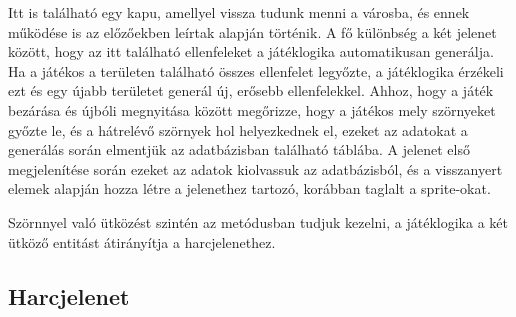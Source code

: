 Itt is található egy kapu, amellyel vissza tudunk menni a városba, és ennek működése is az előzőekben leírtak alapján történik. 
A fő különbség a két jelenet között, hogy az itt található ellenfeleket a játéklogika automatikusan generálja. 
Ha a játékos a területen található összes ellenfelet legyőzte, a játéklogika érzékeli ezt és egy újabb területet generál új, erősebb ellenfelekkel. 
Ahhoz, hogy a játék bezárása és újbóli megnyitása között megőrizze, hogy a játékos mely szörnyeket győzte le, és a hátrelévő szörnyek hol helyezkednek el, ezeket az adatokat a generálás során elmentjük az adatbázisban található  táblába. 
A jelenet első megjelenítése során ezeket az adatok kiolvassuk az adatbázisból, és a visszanyert elemek alapján hozza létre a jelenethez tartozó, korábban taglalt  a sprite-okat. 

Szörnnyel való ütközést szintén az  metódusban tudjuk kezelni, a játéklogika a két ütköző entitást átirányítja a harcjelenethez. 

\subsection*{Harcjelenet}
\label{harc}

